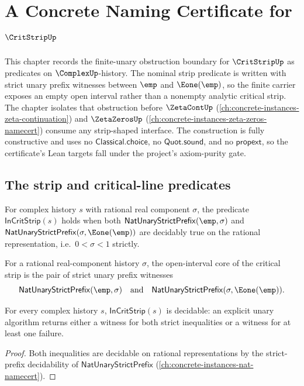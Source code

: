 \chapter{A Concrete Naming Certificate for \(\CritStripUp\)}
\label{ch:concrete-instances-critical-strip-namecert}

This chapter records the finite-unary obstruction boundary for $\CritStripUp$ as predicates on $\ComplexUp$-history. The nominal strip predicate is written with strict unary prefix witnesses between $\emp$ and $\Eone(\emp)$, so the finite carrier exposes an empty open interval rather than a nonempty analytic critical strip. The chapter isolates that obstruction before $\ZetaContUp$ (\autoref{ch:concrete-instances-zeta-continuation}) and $\ZetaZerosUp$ (\autoref{ch:concrete-instances-zeta-zeros-namecert}) consume any strip-shaped interface. The construction is fully constructive and uses no $\mathsf{Classical.choice}$, no $\mathsf{Quot.sound}$, and no $\mathsf{propext}$, so the certificate's Lean targets fall under the project's axiom-purity gate.

\section{The strip and critical-line predicates}

\begin{definition}
\label{def:in-crit-strip}
For complex history \(s\) with rational real component \(\sigma\), the predicate \(\mathsf{InCritStrip}(s)\) holds when both \(\mathsf{NatUnaryStrictPrefix}(\emp, \sigma)\) and \(\mathsf{NatUnaryStrictPrefix}(\sigma, \Eone(\emp))\) are decidably true on the rational representation, i.e.\ \(0 < \sigma < 1\) strictly.
\end{definition}

\begin{definition}
\label{def:crit-strip-open-interval}
For a rational real-component history $\sigma$, the open-interval core of the
critical strip is the pair of strict unary prefix witnesses
$$
\mathsf{NatUnaryStrictPrefix}(\emp,\sigma)
\quad\text{and}\quad
\mathsf{NatUnaryStrictPrefix}(\sigma,\Eone(\emp)).
$$
\end{definition}

\begin{lemma}
\label{lem:in-crit-strip-decidable}
For every complex history \(s\), \(\mathsf{InCritStrip}(s)\) is decidable: an explicit unary algorithm returns either a witness for both strict inequalities or a witness for at least one failure.
\end{lemma}
\begin{proof}
Both inequalities are decidable on rational representations by the strict-prefix decidability of \(\mathsf{NatUnaryStrictPrefix}\) (\autoref{ch:concrete-instances-nat-namecert}).
\end{proof}

